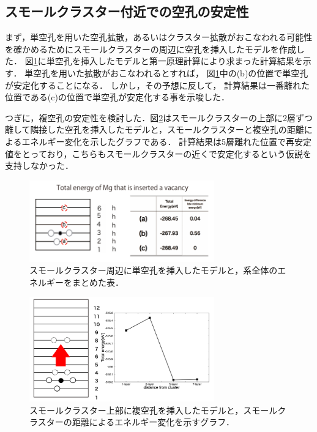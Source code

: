 \documentclass[a4j,twocolumn]{jsarticle}
\begin{document}
\vspace{-1.0\baselineskip}

\subsection{スモールクラスター付近での空孔の安定性}

まず，単空孔を用いた空孔拡散，あるいはクラスター拡散がおこなわれる可能性を確かめるためにスモールクラスターの周辺に空孔を挿入したモデルを作成した．
図\ref{fig:five}に単空孔を挿入したモデルと第一原理計算により求まった計算結果を示す．
単空孔を用いた拡散がおこなわれるとすれば，
図\ref{fig:five}中の(b)の位置で単空孔が安定化することになる．
しかし，その予想に反して，
計算結果は一番離れた位置である(c)の位置で単空孔が安定化する事を示唆した．

つぎに，複空孔の安定性を検討した．図\ref{fig:six}はスモールクラスターの上部に2層ずつ離して隣接した空孔を挿入したモデルと，スモールクラスターと複空孔の距離によるエネルギー変化を示したグラフである．
計算結果は5層離れた位置で再安定値をとっており，こちらもスモールクラスターの近くで安定化するという仮説を支持しなかった．


\begin{figure}[H]
\begin{center}
   \includegraphics[width=80mm]{./vacancy.png}
  \caption{スモールクラスター周辺に単空孔を挿入したモデルと，系全体のエネルギーをまとめた表．}
  \label{fig:five}
\end{center}
\end{figure}

\begin{figure}[H]
\vspace{-1.0\baselineskip}
\begin{center}
   \includegraphics[width=80mm]{./double_vacancy.png}
  \caption{スモールクラスター上部に複空孔を挿入したモデルと，スモールクラスターの距離によるエネルギー変化を示すグラフ．}
  \label{fig:six}
\end{center}
\end{figure}
\end{document}
